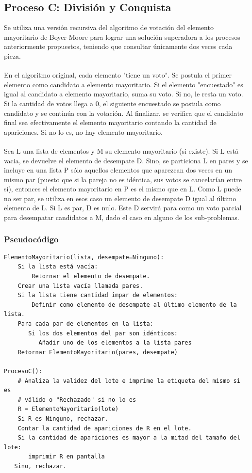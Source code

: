\subsection{Proceso C: División y Conquista}
Se utiliza una versión recursiva del algoritmo de votación del elemento mayoritario de Boyer-Moore para lograr una solución superadora a los procesos anteriormente propuestos,
teniendo que consultar únicamente dos veces cada pieza.\\\\
En el algoritmo original, cada elemento "tiene un voto". Se postula el primer elemento
como candidato a elemento mayoritario. Si el elemento "encuestado" es igual al candidato a elemento mayoritario, suma su voto. 
Si no, le resta un voto. Si la cantidad de votos llega a 0, el siguiente encuestado se postula como candidato y se continúa con la votación.
Al finalizar, se verifica que el candidato final sea efectivamente el elemento mayoritario contando la cantidad de apariciones. Si no lo es, no hay elemento mayoritario.\\
\\
Sea L una lista de elementos y M su elemento mayoritario (si existe). Si L está vacia, se devuelve el elemento de desempate D. Sino, se particiona L en pares y se incluye en una lista P sólo aquellos elementos que aparezcan dos veces en un mismo par (puesto que si la pareja no es idéntica, sus votos se cancelarían entre sí), 
entonces el elemento mayoritario en P es el mismo que en L. Como L puede no ser par, se utiliza en esos caso un elemento de desempate D igual al último elemento de L. 
Si L es par, D es nulo. Este D servirá para como un voto parcial para desempatar candidatos a M, dado el caso en alguno de los sub-problemas.

\subsubsection{Pseudocódigo}
\newcommand\bold[1]{\textbf{#1}}
\begin{Verbatim}[commandchars=\\\{\}]
ElementoMayoritario(lista, desempate=Ninguno):
    Si la lista está vacía:
        Retornar el elemento de desempate.
    Crear una lista vacía llamada pares.
    Si la lista tiene cantidad impar de elementos:
        Definir como elemento de desempate al último elemento de la lista.
    Para cada par de elementos en la lista:
       Si los dos elementos del par son idénticos:
          Añadir uno de los elementos a la lista pares
    Retornar ElementoMayoritario(pares, desempate)
    
ProcesoC():
    # Analiza la validez del lote e imprime la etiqueta del mismo si es
    # válido o "Rechazado" si no lo es
    R = ElementoMayoritario(lote)
    Si R es Ninguno, rechazar.    
    Contar la cantidad de apariciones de R en el lote.
    Si la cantidad de apariciones es mayor a la mitad del tamaño del lote:
       imprimir R en pantalla
   Sino, rechazar.
\end{Verbatim}

